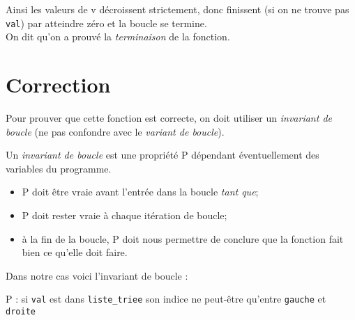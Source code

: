 Ainsi les valeurs de v décroissent strictement, donc finissent (si on ne trouve pas \texttt{val}) par atteindre zéro et la boucle se termine.\\
On dit qu'on a prouvé la \textit{terminaison} de la fonction.

\section{Correction}

Pour prouver que cette fonction est correcte, on doit utiliser un \textit{invariant de boucle} (ne pas confondre avec le \textit{variant de boucle}).

\begin{definition}
	Un \textit{invariant de boucle} est une propriété P dépendant éventuellement des variables du programme.
	\begin{itemize}
		\item 	P doit être vraie avant l'entrée dans la boucle \textit{tant que};
		\item 	P doit rester vraie à chaque itération de boucle;
		\item 	à la fin de la boucle, P doit nous permettre de conclure que la fonction \og fait bien ce qu'elle doit faire\fg{}.
	\end{itemize}
\end{definition}

Dans notre cas voici l'invariant de boucle :
\begin{center}
	P :  si \texttt{val} est dans \texttt{liste_triee} son indice ne peut-être qu'entre \texttt{gauche} et \texttt{droite}\fg{}
\end{center}

